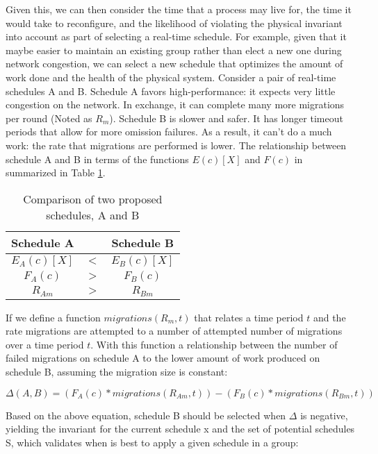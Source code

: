 Given this, we can then consider the time that a process may live for, the time it would take to reconfigure, and the likelihood of violating the physical invariant into account as part of selecting a real-time schedule.
For example, given that it maybe easier to maintain an existing group rather than elect a new one during network congestion, we can select a new schedule that optimizes the amount of work done and the health of the physical system.
Consider a pair of real-time schedules A and B.
Schedule A favors high-performance: it expects very little congestion on the network.
In exchange, it can complete many more migrations per round (Noted as $R_{m}$).
Schedule B is slower and safer.
It has longer timeout periods that allow for more omission failures.
As a result, it can't do a much work: the rate that migrations are performed is lower.
The relationship between schedule A and B in terms of the functions $E(c)[X]$ and $F(c)$ in summarized in Table \ref{tab:SCHED-COMPARE}.

\begin{table}
\caption{Comparison of two proposed schedules, A and B}
\label{tab:SCHED-COMPARE}
\centering
\begin{tabular}{ c  c  c }
Schedule A & & Schedule B \\ \hline
$E_{A}(c)[X]$ & $<$ & $E_{B}(c)[X]$ \\
$F_{A}(c)$ & $>$ & $F_{B}(c)$ \\ 
$R_{Am}$ & $>$ & $R_{Bm}$ \\ 
\end{tabular}
\end{table}

If we define a function $migrations(R_{m},t)$ that relates a time period $t$ and the rate migrations are attempted to a number of attempted number of migrations over a time period $t$.
With this function a relationship between the number of failed migrations on schedule A to the lower amount of work produced on schedule B, assuming the migration size is constant:

\begin{equation}
\Delta(A,B) = (F_{A}(c) * migrations(R_{Am},t)) - (F_{B}(c) * migrations(R_{Bm},t))
\end{equation}

Based on the above equation, schedule B should be selected when $\Delta$ is negative, yielding the invariant for the current schedule x and the set of potential schedules S, which validates when is best to apply
a given schedule in a group:

